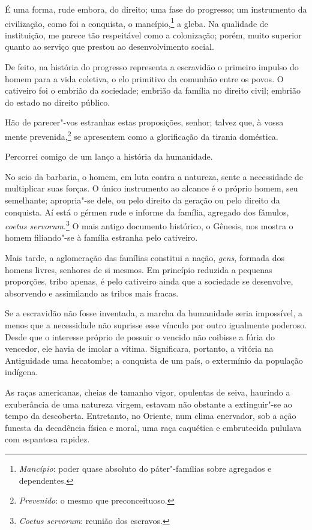 É uma forma, rude embora, do direito; uma fase do progresso; um
instrumento da civilização, como foi a conquista, o
mancípio,\footnote{ \textit{Mancípio}: poder quase absoluto do páter"-famílias
sobre agregados e dependentes.} a gleba. Na qualidade de instituição, me parece tão respeitável como a
colonização; porém, muito superior quanto ao serviço que prestou ao
desenvolvimento social.

De feito, na história do progresso representa a escravidão o primeiro
impulso do homem para a vida coletiva, o elo primitivo da comunhão
entre os povos. O cativeiro foi o embrião da sociedade; embrião da
família no direito civil; embrião do estado no direito público.

Hão de parecer"-vos estranhas estas proposições, senhor; talvez que, à
vossa mente prevenida,\footnote{ \textit{Prevenido}: o mesmo que preconceituoso.} 
se apresentem como a glorificação da tirania doméstica. 

Percorrei comigo de um lanço a história da humanidade. 

\sectionitem

No seio da barbaria, o homem, em luta contra a natureza, sente a
necessidade de multiplicar suas forças. O único instrumento ao alcance
é o próprio homem, seu semelhante; apropria"-se dele, ou pelo direito	\label{barbaria}
da geração ou pelo direito da conquista. Aí está o gérmen rude e
informe da família, agregado dos fâmulos, \textit{coetus
servorum}.\footnote{ \textit{Coetus servorum}: reunião dos escravos.} 
O mais antigo documento histórico, o Gênesis, nos mostra o homem
filiando"-se à família estranha pelo cativeiro. 

Mais tarde, a aglomeração das famílias constitui a nação, \textit{gens},
formada dos homens livres, senhores de si mesmos. Em princípio reduzida
a pequenas proporções, tribo apenas, é pelo cativeiro ainda que a
sociedade se desenvolve, absorvendo e assimilando as tribos mais fracas.

Se a escravidão não fosse inventada, a marcha da humanidade seria
impossível, a menos que a necessidade não suprisse esse vínculo por
outro igualmente poderoso. Desde que o interesse próprio de possuir o
vencido não coibisse a fúria do vencedor, ele havia de imolar a vítima.
Significara, portanto, a vitória na Antiguidade uma hecatombe; a \label{hecatombe}
conquista de um país, o extermínio da população indígena. 

As raças americanas, cheias de tamanho vigor, opulentas de seiva,
haurindo a exuberância de uma natureza virgem, estavam não obstante a
extinguir"-se ao tempo da descoberta. Entretanto, no Oriente, num
clima enervador, sob a ação funesta da decadência física e moral, uma
raça caquética e embrutecida pululava com espantosa rapidez. 

